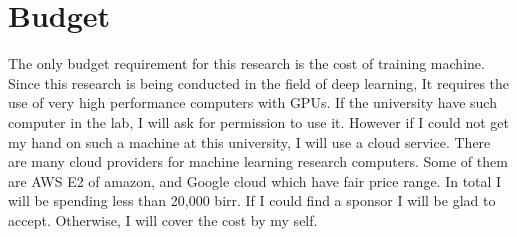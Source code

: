 \documentclass[../main/main.tex]{subfiles}
\begin{document}
	\section{Budget}
	The only budget requirement for this research is the cost of training machine. Since this research is being conducted in the field of deep learning, It requires the use of very high performance computers with \gls{GPU}s. If the university have such computer in the lab, I will ask for permission to use it. However if I could not get my hand on such a machine at this university, I will use a cloud service. There are many cloud providers for machine learning research computers. Some of them are AWS E2 of amazon, and Google cloud which have fair price range. In total I will be spending less than 20,000 birr. If I could find a sponsor I will be glad to accept. Otherwise, I will cover the cost by my self.   	
\end{document}
